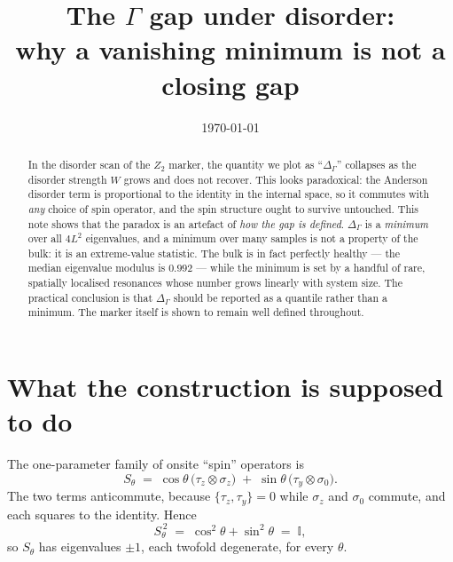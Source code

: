 \documentclass[11pt,a4paper]{article}
\title{\bf The $\Gamma$ gap under disorder:\\ why a vanishing minimum is not a closing gap}
\author{}
\date{\today}
\newcommand{\Sth}{S_\theta}
\begin{document}
\maketitle

\begin{abstract}
\noindent
In the disorder scan of the $Z_2$ marker, the quantity we plot as
``$\Delta_\Gamma$'' collapses as the disorder strength $W$ grows and does not
recover. This looks paradoxical: the Anderson disorder term is proportional to
the identity in the internal space, so it commutes with \emph{any} choice of
spin operator, and the spin structure ought to survive untouched. This note
shows that the paradox is an artefact of \emph{how the gap is defined}.
$\Delta_\Gamma$ is a \emph{minimum} over all $4L^2$ eigenvalues, and a minimum
over many samples is not a property of the bulk: it is an extreme-value
statistic. The bulk is in fact perfectly healthy --- the median eigenvalue
modulus is $0.992$ --- while the minimum is set by a handful of rare,
spatially localised resonances whose number grows linearly with system size.
The practical conclusion is that $\Delta_\Gamma$ should be reported as a
quantile rather than a minimum. The marker itself is shown to remain
well defined throughout.
\end{abstract}

\section{What the construction is supposed to do}

The one-parameter family of onsite ``spin'' operators is
\begin{equation}
  \Sth \;=\; \cos\theta \,\bigl(\tau_z\otimes\sigma_z\bigr)
           \;+\; \sin\theta \,\bigl(\tau_y\otimes\sigma_0\bigr).
  \label{eq:Stheta}
\end{equation}
The two terms anticommute, because $\{\tau_z,\tau_y\}=0$ while
$\sigma_z$ and $\sigma_0$ commute, and each squares to the identity. Hence
\begin{equation}
  \Sth^{\,2} \;=\; \cos^2\theta + \sin^2\theta \;=\; \mathbb{I},
\end{equation}
so $\Sth$ has eigenvalues $\pm 1$, each twofold degenerate, for every $\theta$.
\end{document}
